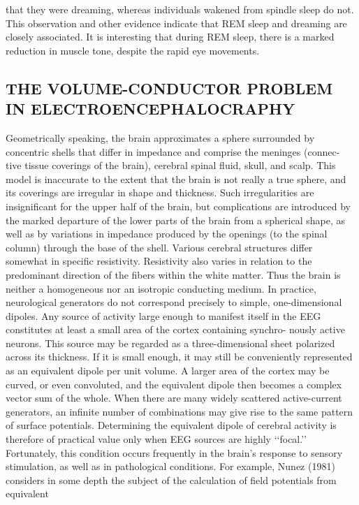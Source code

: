 that they were dreaming, whereas individuals wakened from spindle sleep do
not. This observation and other evidence indicate that REM sleep and
dreaming are closely associated. It is interesting that during REM sleep, there
is a marked reduction in muscle tone, despite the rapid eye movements.

\subsection{THE VOLUME-CONDUCTOR PROBLEM IN ELECTROENCEPHALOCRAPHY}

Geometrically speaking, the brain approximates a sphere surrounded by
concentric shells that differ in impedance and comprise the meninges (connec-
tive tissue coverings of the brain), cerebral spinal fluid, skull, and scalp. This
model is inaccurate to the extent that the brain is not really a true sphere, and
its coverings are irregular in shape and thickness. Such irregularities are
insignificant for the upper half of the brain, but complications are introduced
by the marked departure of the lower parts of the brain from a spherical shape,
as well as by variations in impedance produced by the openings (to the spinal
column) through the base of the shell. Various cerebral structures differ
somewhat in specific resistivity. Resistivity also varies in relation to the
predominant direction of the fibers within the white matter. Thus the brain
is neither a homogeneous nor an isotropic conducting medium.
In practice, neurological generators do not correspond precisely to simple,
one-dimensional dipoles. Any source of activity large enough to manifest itself
in the EEG constitutes at least a small area of the cortex containing synchro-
nously active neurons. This source may be regarded as a three-dimensional
sheet polarized across its thickness. If it is small enough, it may still be
conveniently represented as an equivalent dipole per unit volume. A larger
area of the cortex may be curved, or even convoluted, and the equivalent
dipole then becomes a complex vector sum of the whole. When there are many
widely scattered active-current generators, an infinite number of combinations
may give rise to the same pattern of surface potentials.
Determining the equivalent dipole of cerebral activity is therefore of
practical value only when EEG sources are highly ‘‘focal.’’ Fortunately, this
condition occurs frequently in the brain’s response to sensory stimulation, as
well as in pathological conditions. For example, Nunez (1981) considers in
some depth the subject of the calculation of field potentials from equivalent
